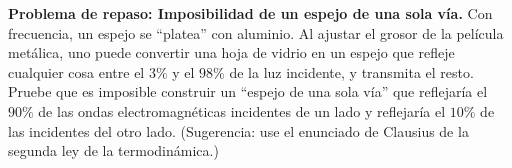 \item \textbf{Problema de repaso: Imposibilidad de un espejo de una sola vía.}
Con frecuencia, un espejo se ``platea'' con aluminio. Al ajustar el grosor de la película metálica, uno puede convertir una hoja de vidrio en un espejo que refleje cualquier cosa entre el $3\%$ y el $98\%$ de la luz incidente, y transmita el resto. Pruebe que es imposible construir un ``espejo de una sola vía'' que reflejaría el $90\%$ de las ondas electromagnéticas incidentes de un lado y reflejaría el $10\%$ de las incidentes del otro lado. (Sugerencia: use el enunciado de Clausius de la segunda ley de la termodinámica.)